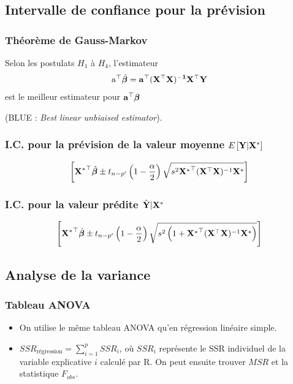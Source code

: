 \documentclass[10pt, french]{article}
\begin{document}
\begin{multicols*}{3}
\subsection*{Intervalle de confiance pour la prévision}
\subsubsection*{Théorème de Gauss-Markov}
Selon les postulats $H_1$ à $H_4$, l'estimateur
\begin{align*}
\mathrm{a^\top} \hat{\bm{\beta}} = \mathbf{a^\top (X^\top X)^{-1} X^\top Y}
\end{align*}
est le meilleur estimateur pour $\mathbf{a^\top} \bm{\beta}$

(BLUE : \textit{Best linear unbiaised estimator}).

\subsubsection*{I.C. pour la prévision de la valeur moyenne $E \left[ \mathbf{Y} | \mathbf{X^*} \right]$}
\begin{align*}
\left[ \mathbf{{X^*}^\top} \hat{\bm{\beta}} \pm t_{n-p'}\left(1 - \frac{\alpha}{2} \right) \sqrt{s^2 \mathbf{{X^*}^\top} (\mathbf{X}^\top \mathbf{X})^{-1}\mathbf{X^*}} \right]
\end{align*}

\subsubsection*{I.C. pour la valeur prédite $\hat{\mathbf{Y}}|\mathbf{X^*}$}
\begin{align*}
\left[ \mathbf{{X^*}^\top} \hat{\bm{\beta}} \pm t_{n-p'}\left(1 - \frac{\alpha}{2} \right) \sqrt{s^2\left( 1 +  \mathbf{{X^*}^\top} (\mathbf{X}^\top \mathbf{X})^{-1}\mathbf{X^*}\right)} \right]
\end{align*}


\subsection*{Analyse de la variance}
\subsubsection*{Tableau ANOVA}
\begin{itemize}
\item On utilise le même tableau ANOVA qu'en régression linéaire simple.
\item $SSR_{\text{régression}} = \sum_{i=1}^{p} SSR_i $, où $SSR_i$ représente le SSR individuel de la variable explicative $i$ calculé par R. On peut ensuite trouver $MSR$ et la statistique $F_{obs}$.
\end{itemize}


\end{multicols*}
\end{document}
